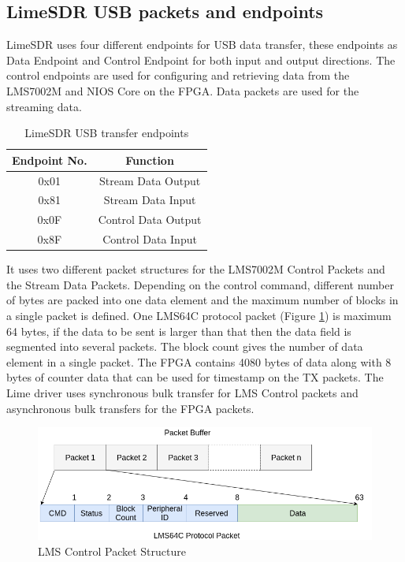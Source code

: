 \documentclass{kththesis}
\begin{document}
\subsection{LimeSDR USB packets and endpoints}
LimeSDR uses four different endpoints for USB data transfer, these endpoints as Data Endpoint and Control Endpoint for both input and output directions. The control endpoints are used for configuring and retrieving data from the LMS7002M and NIOS Core on the FPGA. Data packets are used for the streaming data. 
\begin{table}[h!]
\centering
\begin{tabular}{|c|c|}
\hline
Endpoint No. & Function\\
\hline
0x01 & Stream Data Output\\
0x81 & Stream Data Input\\
0x0F & Control Data Output\\
0x8F & Control Data Input\\
\hline
\end{tabular}
\caption{LimeSDR USB transfer endpoints}
\end{table}
It uses two different packet structures for the LMS7002M Control Packets and the Stream Data Packets. Depending on the control command, different number of bytes are packed into one data element and the maximum number of blocks in a single packet is defined. One LMS64C protocol packet (Figure \ref{lms_packet}) is maximum 64 bytes, if the data to be sent is larger than that then the data field is segmented into several packets. The block count gives the number of data element in a single packet. The FPGA contains 4080 bytes of data along with 8 bytes of counter data that can be used for timestamp on the TX packets. The Lime driver uses synchronous bulk transfer for LMS Control packets and asynchronous bulk transfers for the FPGA packets.
\begin{figure}[h!]
\centering
\includegraphics[width=\textwidth]{LMS64C_Packet.png}
\caption{LMS Control Packet Structure}
\label{lms_packet}
\end{figure}
\end{document}
